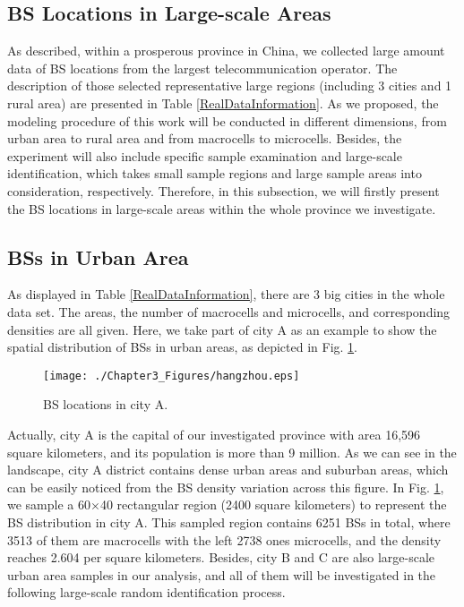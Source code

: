 \subsection{BS Locations in Large-scale Areas}
As described, within a prosperous province in China, we collected large amount data of BS locations from the largest telecommunication operator. The description of those selected representative large regions (including 3 cities and 1 rural area) are presented in Table \ref{RealDataInformation}. As we proposed, the modeling procedure of this work will be conducted in different dimensions, from urban area to rural area and from macrocells to microcells. Besides, the experiment will also include specific sample examination and large-scale identification, which takes small sample regions and large sample areas into consideration, respectively. Therefore, in this subsection, we will firstly present the BS locations in large-scale areas within the whole province we investigate.

\subsection*{BSs in Urban Area}
As displayed in Table \ref{RealDataInformation}, there are 3 big cities in the whole data set. The areas, the number of macrocells and microcells, and corresponding densities are all given. Here, we take part of city A as an example to show the spatial distribution of BSs in urban areas, as depicted in Fig. \ref{c3-hangzhou}.

\begin{figure}[!htb]
\centering
\texttt{[image: ./Chapter3\_Figures/hangzhou.eps]}
\caption{BS locations in city A.}
\centering
\label{c3-hangzhou}
\end{figure}

Actually, city A is the capital of our investigated province with area 16,596 square kilometers, and its population is more than 9 million. As we can see in the landscape, city A district contains dense urban areas and suburban areas, which can be easily noticed from the BS density variation across this figure. In Fig. \ref{c3-hangzhou}, we sample a 60$\times$40 rectangular region (2400 square kilometers) to represent the BS distribution in city A. This sampled region contains 6251 BSs in total, where 3513 of them are macrocells with the left 2738 ones microcells, and the density reaches 2.604 per square kilometers. Besides, city B and C are also large-scale urban area samples in our analysis, and all of them will be investigated in the following large-scale random identification process.

